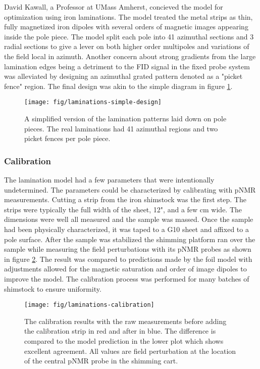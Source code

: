 David Kawall, a Professor at UMass Amherst, concieved the model for optimization using iron laminations.  The model treated the metal strips as thin, fully magnetized iron dipoles with several orders of magnetic images appearing inside the pole piece.  The model split each pole into 41 azimuthal sections and 3 radial sections to give a lever on both higher order multipoles and variations of the field local in azimuth.  Another concern about strong gradients from the large lamination edges being a detriment to the FID signal in the fixed probe system was alleviated by designing an azimuthal grated pattern denoted as a "picket fence" region.  The final design was akin to the simple diagram in figure \ref{fig:laminations-simple-design}.

\begin{figure}
\label{fig:laminations-simple-design}
\texttt{[image: fig/laminations-simple-design]}
\caption{A simplified version of the lamination patterns laid down on pole pieces.  The real laminations had 41 azimuthal regions and two picket fences per pole piece.}
\end{figure}

\subsubsection{Calibration}

The lamination model had a few parameters that were intentionally undetermined.  The parameters could be characterized by calibrating with pNMR measurements.  Cutting a strip from the iron shimstock was the first step.  The strips were typically the full width of the sheet, 12", and a few \si{\centi\meter} wide.  The dimensions were well all measured and the sample was massed.  Once the sample had been physically characterized, it was taped to a G10 sheet and affixed to a pole surface.  After the sample was stabilized the shimming platform ran over the sample while measuring the field perturbations with its pNMR probes as shown in figure \ref{fig:laminations-calibration}.  The result was compared to predictions made by the foil model with adjustments allowed for the magnetic saturation and order of image dipoles to improve the model.  The calibration process was performed for many batches of shimstock to ensure uniformity.

\begin{figure}
\label{fig:laminations-calibration}
\texttt{[image: fig/laminations-calibration]}
\caption{The calibration results with the raw measurements before adding the calibration strip in red and after in blue.  The difference is compared to the model prediction in the lower plot which shows excellent agreement.  All values are field perturbation at the location of the central pNMR probe in the shimming cart.}
\end{figure}

